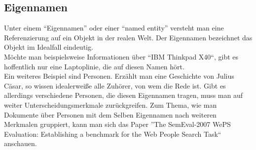 \subsection{Eigennamen}
Unter einem ``Eigennamen'' oder einer ``named entity'' versteht man eine Referenzierung auf ein Objekt in der realen Welt. Der Eigennamen bezeichnet das Objekt im Idealfall eindeutig.\\
Möchte man beispielsweise Informationen über ``IBM Thinkpad X40``, gibt es hoffentlich nur eine Laptoplinie, die auf diesen Namen hört.\\
Ein weiteres Beispiel sind Personen. Erzählt man eine Geschichte von Julius Cäsar, so wissen idealerweiße alle Zuhörer, von wem die Rede ist. Gibt es allerdings verschiedene Personen, die diesen Eigennamen tragen, muss man auf weiter Unterscheidungsmerkmale zurückgreifen. Zum Thema, wie man Dokumente über Personen mit dem Selben Eigennamen nach weiteren Merkmalen gruppiert, kann man sich das Paper ''The SemEval-2007 WePS Evaluation: Establishing a benchmark for the Web People Search Task``\cite{paper:Artiles} anschauen.
